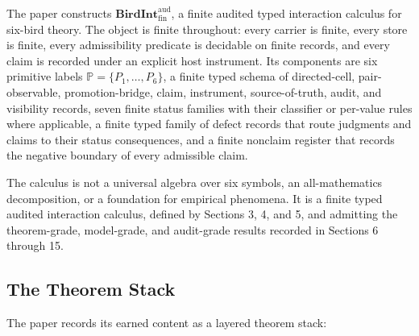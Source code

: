 \documentclass[11pt]{article}
\theoremstyle{definition}
\begin{document}
The paper constructs \(\mathbf{BirdInt}^{\mathrm{aud}}_{\mathrm{fin}}\), a finite audited typed interaction calculus for six-bird theory. The object is finite throughout: every carrier is finite, every store is finite, every admissibility predicate is decidable on finite records, and every claim is recorded under an explicit host instrument. Its components are six primitive labels \(\mathbb P=\{P_{1},\ldots,P_{6}\}\), a finite typed schema of directed-cell, pair-observable, promotion-bridge, claim, instrument, source-of-truth, audit, and visibility records, seven finite status families with their classifier or per-value rules where applicable, a finite typed family of defect records that route judgments and claims to their status consequences, and a finite nonclaim register that records the negative boundary of every admissible claim.

The calculus is not a universal algebra over six symbols, an all-mathematics decomposition, or a foundation for empirical phenomena. It is a finite typed audited interaction calculus, defined by Sections 3, 4, and 5, and admitting the theorem-grade, model-grade, and audit-grade results recorded in Sections 6 through 15.

\subsection{The Theorem Stack}

The paper records its earned content as a layered theorem stack:
\end{document}

